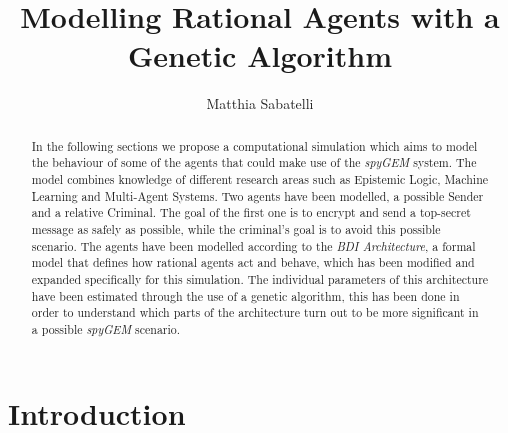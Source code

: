 \documentclass[a4paper]{article}
\begin{document}
\title {Modelling Rational Agents with a Genetic Algorithm}
\author{Matthia Sabatelli}

\pagestyle{empty}
\maketitle


\thispagestyle{empty}
\begin{abstract}

In the following sections we propose a computational simulation which aims to model the behaviour of some of the agents that could make use of the \textit{spyGEM} system. The model combines knowledge of different research areas such as Epistemic Logic, Machine Learning and Multi-Agent Systems. Two agents have been modelled, a possible Sender and a relative Criminal. The goal of the first one is to encrypt and send a top-secret message as safely as possible, while the criminal's goal is to avoid this possible scenario. The agents have been modelled according to the \textit{BDI Architecture}, a formal model that defines how rational agents act and behave, which has been modified and expanded specifically for this simulation. The individual parameters of this architecture have been estimated through the use of a genetic algorithm, this has been done in order to understand which parts of the architecture turn out to be more significant in a possible \textit{spyGEM} scenario.        

\end{abstract}

\section{Introduction}
\end{document}
